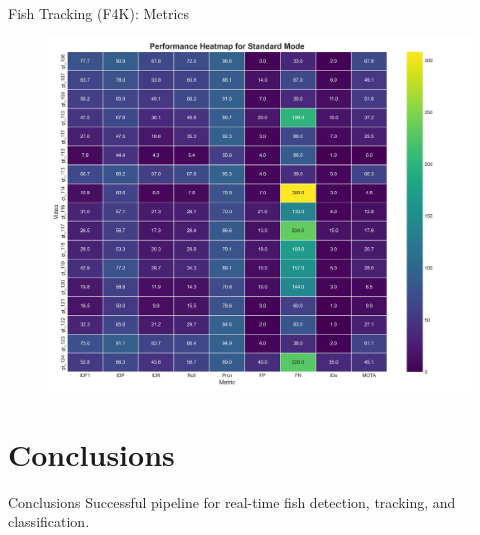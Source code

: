 \documentclass[serif]{beamer}  %
\begin{document}
\begin{frame}{Fish Tracking (F4K): Metrics}

\begin{figure}
    \centering
    \includegraphics[width=0.8\linewidth]{images/standard_performance_heatmap.png}
\end{figure}
    
\end{frame}






\section{Conclusions}

\begin{frame}{Conclusions}
    Successful pipeline for real-time fish detection, tracking, and classification.

    \begin{figure}
        \centering
    \end{figure}
    
\end{frame}
\end{document}
